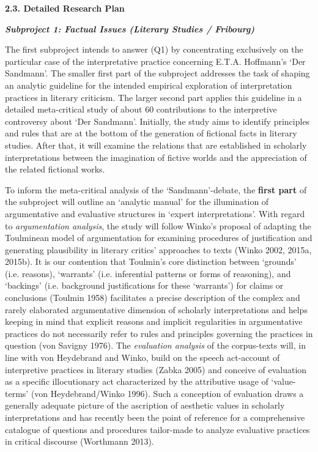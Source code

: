 \noindent\textbf{\large 2.3. Detailed Research Plan}




\vspace{.2cm}
\noindent\textbf{\emph{Subproject 1: Factual Issues (Literary Studies / Fribourg)}}
\vspace{.1cm}

\noindent The first subproject intends to answer (Q1) by concentrating exclusively on the particular case of the interpretative practice concerning E.T.A. Hoffmann's `Der Sandmann'. The smaller first part of the subproject addresses the task of shaping an analytic guideline for the intended empirical exploration of interpretation practices in literary criticism. The larger second part applies this guideline in a detailed meta-critical study of about 60 contributions to the interpretive controversy about `Der Sandmann'. Initially, the study aims to identify principles and rules that are at the bottom of the generation of fictional facts in literary studies. After that, it will examine the relations that are established in scholarly interpretations between the imagination of fictive worlds and the appreciation of the related fictional works.


To inform  the meta-critical analysis of the `Sandmann'-debate, the \textbf{first part} of the subproject will outline an `analytic manual' for the illumination of argumentative and evaluative structures in `expert interpretations'. With regard to \emph{argumentation analysis}, the study will follow Winko's proposal of adapting the Toulminean model of argumentation for examining procedures of justification and generating plausibility in literary critics' approaches to texts (Winko 2002, 2015a, 2015b). It is our contention that Toulmin's core distinction between `grounds' (i.e. reasons), `warrants' (i.e. inferential patterns or forms of reasoning), and `backings' (i.e. background justifications for these `warrants') for claims or conclusions (Toulmin 1958) facilitates a precise description of the complex and rarely elaborated argumentative dimension of scholarly interpretations and helps keeping in mind that explicit reasons and implicit regularities in argumentative practices do not necessarily refer to rules and principles governing the practices in question (von Savigny 1976). The \emph{evaluation analysis} of the corpus-texts will, in line with von Heydebrand and Winko, build on the speech act-account of interpretive practices in literary studies (Zabka 2005) and conceive of evaluation as a specific illocutionary act characterized by the attributive usage of `value-terms' (von Heydebrand/Winko 1996). Such a conception of evaluation draws a generally adequate picture of the ascription of aesthetic values in scholarly interpretations and has recently been the point of reference for a comprehensive catalogue of questions and procedures tailor-made to analyze evaluative practices in critical discourse (Worthmann 2013).

